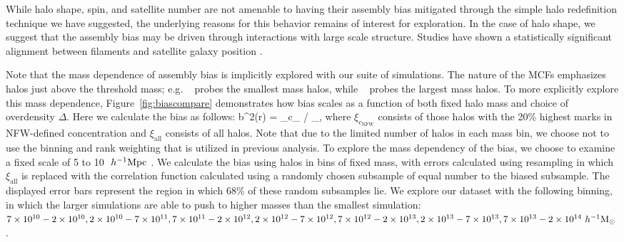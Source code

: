 \documentclass[usenatbib,fleqn]{mnras}
\begin{document}

While halo shape, spin, and satellite number are not amenable to having their assembly bias mitigated through the
simple halo redefinition technique we have suggested, the underlying reasons for this behavior remains of
interest for exploration. In the case of halo shape, we suggest that the assembly bias may be driven through
interactions with large scale structure. Studies have shown a statistically significant alignment between
filaments and satellite galaxy position \citep{tempel_etal15, velliscig_etal15}.

Note that the mass dependence of assembly bias is implicitly explored with our suite of simulations.
The nature of the MCFs emphasizes halos just above the threshold mass; e.g. \simA~ probes the smallest mass
halos, while \simB~ probes the largest mass halos. To more explicitly explore this mass dependence, Figure~\ref{fig:biascompare}
demonstrates how bias scales as a function of both fixed halo mass and choice of overdensity $\Delta$. Here we calculate the bias as follows:
\beq
b^2(r) = \xi_{c_} / \xi_{},
\eeq
where $\xi_{c_\mathrm{NFW}}$ consists of those halos with the 20\% highest marks in NFW-defined concentration
and $\xi_{\mathrm{all}}$ consists of all halos. Note that due to the limited number of halos in each mass bin, we choose not to use the binning and rank weighting that is utilized in previous analysis.  To explore the mass dependency of the bias, we choose to
examine a fixed scale of 5 to 10 $\ h^{-1}\mathrm{Mpc}~$. We calculate the bias using halos in bins of fixed mass, with errors
calculated using resampling in which $\xi_{\mathrm{all}}$ is replaced with the correlation function calculated
using a randomly chosen subsample of equal number to the biased subsample. The displayed error bars represent
the region in which 68\% of these random subsamples lie. We explore our dataset with the following binning,
in which the larger simulations are able to push to higher masses than the smallest simulation:
$7\times10^{10}-2\times10^{10}, 2\times10^{10}-7\times10^{11},7\times10^{11}-2\times10^{12},
2\times10^{12}-7\times10^{12},7\times10^{12}-2\times10^{13},2\times10^{13}-7\times10^{13},
7\times10^{13}-2\times10^{14} \ h^{-1}\mathrm{M}_{\odot}~$.
\end{document}

